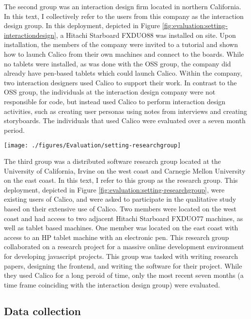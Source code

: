 The second group was an interaction design firm located in northern California. In this text, I collectively refer to the users from this company as the interaction design group. In this deployment, depicted in Figure \ref{fig:evaluation:setting-interactiondesign}, a Hitachi Starboard FXDUO88 was installed on site. Upon installation, the members of the company were invited to a tutorial and shown how to launch Calico from their own machines and connect to the boards. While no tablets were installed, as was done with the OSS group, the company did already have pen-based tablets which could launch Calico. Within the company, two interaction designers used Calico to support their work. In contrast to the OSS group, the individuals at the interaction design company were not responsible for code, but instead used Calico to perform interaction design activities, such as creating user personas using notes from interviews and creating storyboards. The individuals that used Calico were evaluated over a seven month period.

\begin{figure*}[tbh]
  \centering
  \texttt{[image: ./figures/Evaluation/setting-researchgroup]}
  \caption{The physical setup of the research group}
  \label{fig:evaluation:setting-researchgroup}
\end{figure*}

The third group was a distributed software research group located at the University of California, Irvine on the west coast and Carnegie Mellon University on the east coast. In this text, I refer to this group as the research group. This deployment, depicted in Figure \ref{fig:evaluation:setting-researchgroup}, were existing users of Calico, and were asked to participate in the qualitative study based on their extensive use of Calico. Two members were located on the west coast and had access to two adjacent Hitachi Starboard FXDUO77 machines, as well as tablet based machines. One member was located on the east coast with access to an HP tablet machine with an electronic pen. This research group collaborated on a research project for a massive online development environment for developing javascript projects. This group was tasked with writing research papers, designing the frontend, and writing the software for their project. While they used Calico for a long peroid of time, only the most recent seven months (a time frame coinciding with the interaction design group) were evaluated.

\subsection{Data collection}

